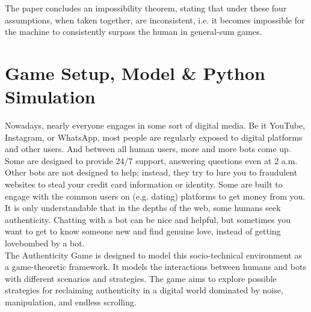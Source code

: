\documentclass{article}
\begin{document}

The paper concludes an impossibility theorem, stating that under these four assumptions, when taken together, are inconsistent, i.e. it becomes impossible for the machine to consistently surpass the human in general-sum games.



\newpage






\section{Game Setup, Model \& Python Simulation} %

Nowadays, nearly everyone engages in some sort of digital media. Be it YouTube, Instagram, or WhatsApp, most people are regularly exposed to digital platforms and other users. And between all human users, more and more bots come up. Some are designed to provide 24/7 support, answering questions even at 2 a.m. Other bots are not designed to help; instead, they try to lure you to fraudulent websites to steal your credit card information or identity. Some are built to engage with the common users on (e.g. dating) platforms to get money from you. \\
It is only understandable that in the depths of the web, some humans seek authenticity. Chatting with a bot can be nice and helpful, but sometimes you want to get to know someone new and find genuine love, instead of getting lovebombed by a bot. 
\\
The Authenticity Game is designed to model this socio-technical environment as a game-theoretic framework. It models the interactions between humans and bots with different scenarios and strategies. The game aims to explore possible strategies for reclaiming authenticity in a digital world dominated by noise, manipulation, and endless scrolling.
\\
\end{document}
